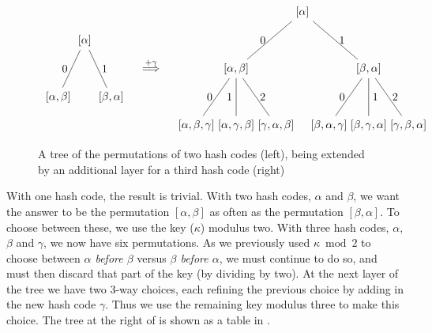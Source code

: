 \documentclass[runningheads,a4paper]{llncs}
\begin{document}
\begin{figure}
\begin{center}
\begin{align*}
\vcenter{
    \hbox{
      \begin{tikzpicture}[scale=1.2,
          level 1/.style={sibling distance=40}]
        \node {$[\alpha]$}
          child {node {$[\alpha,\beta]$} edge from parent node[left] {0}}
          child {node {$[\beta,\alpha]$} edge from parent node[right] {1}};
      \end{tikzpicture}
    }
}
&& \overset{+\gamma}\Longrightarrow &&
\vcenter{
  \hbox{
      \begin{tikzpicture}[scale=1.2,
          level 1/.style={sibling distance=100},
          level 2/.style={sibling distance=30}]
        \node {$[\alpha]$}
          child {node {$[\alpha,\beta]$}
            child {node {$[\alpha,\beta,\gamma]$} edge from parent node[left] {0}}
            child {node {$[\alpha,\gamma,\beta]$} edge from parent node[left] {1}}
            child {node {$[\gamma,\alpha,\beta]$} edge from parent node[right] {2}}
            edge from parent node[left] {0}
          }
          child {node {$[\beta,\alpha]$}
            child {node {$[\beta,\alpha,\gamma]$} edge from parent node[left] {0}}
            child {node {$[\beta,\gamma,\alpha]$} edge from parent node[right] {1}}
            child {node {$[\gamma,\beta,\alpha]$} edge from parent node[right] {2}}
            edge from parent node[right] {1}
          };
      \end{tikzpicture}
  }
}
\end{align*}
\end{center}
\caption{A tree of the permutations of two hash codes (left), being extended by an additional layer for a third hash code (right)}
\label{fig:tree-2-add}
\end{figure}

With one hash code, the result is trivial. With two hash codes,
$\alpha$ and $\beta$, we want the answer to be the permutation
$[\alpha,\beta]$ as often as the permutation $[\beta,\alpha]$. To
choose between these, we use the key ($\kappa$) modulus two. With
three hash codes, $\alpha$, $\beta$ and $\gamma$, we now have six
permutations. As we previously used $\kappa \bmod 2$ to choose between
{\em $\alpha$ before $\beta$} versus {\em $\beta$ before $\alpha$}, we
must continue to do so, and must then discard that part of the key (by
dividing by two). At the next layer of the tree we have two 3-way
choices, each refining the previous choice by adding in the new hash
code $\gamma$. Thus we use the remaining key modulus three to make
this choice. The tree at the right of  is shown
as a table in .
\end{document}
